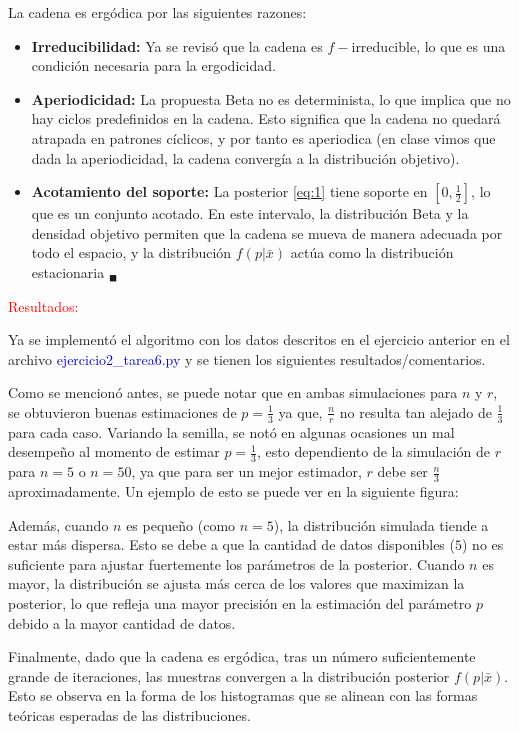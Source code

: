 La cadena es ergódica por las siguientes razones:
\begin{itemize}
	\item \textbf{Irreducibilidad:} Ya se revisó que la cadena es $f-$irreducible, lo que es una condición necesaria para la ergodicidad.
	\item \textbf{Aperiodicidad:} La propuesta Beta no es determinista, lo que implica que no hay ciclos predefinidos en la cadena. Esto significa que la cadena no quedará atrapada en patrones cíclicos, y por tanto es aperiodica (en clase vimos que dada la aperiodicidad, la cadena convergía a la distribución objetivo).
	\item \textbf{Acotamiento del soporte:} La posterior \eqref{eq:1} tiene soporte en $[0, \frac{1}{2}]$, lo que es un conjunto acotado. En este intervalo, la distribución Beta y la densidad objetivo permiten que la cadena se mueva de manera adecuada por todo el espacio, y la distribución $f(p|\bar{x})$ actúa como la distribución estacionaria $_\blacksquare$
\end{itemize}

\textcolor{red}{Resultados:} 

Ya se implementó el algoritmo con los datos descritos en el ejercicio anterior en el archivo \textcolor{mediumblue}{ejercicio2\_tarea6.py} y se tienen los siguientes resultados/comentarios.

Como se mencionó antes, se puede notar que en ambas simulaciones para $n$ y $r$, se obtuvieron buenas estimaciones de $p = \frac{1}{3}$ ya que, $\frac{n}{r}$ no resulta tan alejado de $\frac{1}{3}$ para cada caso. Variando la semilla, se notó en algunas ocasiones un mal desempeño al momento de estimar $p=\frac{1}{3}$, esto dependiento de la simulación de $r$ para $n = 5$  o $n = 50$, ya que para ser un mejor estimador, $r$ debe ser $\frac{n}{3}$ aproximadamente. Un ejemplo de esto se puede ver en la siguiente figura:

Además, cuando $n$ es pequeño (como $n=5$), la distribución simulada tiende a estar más dispersa. Esto se debe a que la cantidad de datos disponibles ($5$) no es suficiente para ajustar fuertemente los parámetros de la posterior. Cuando $n$ es mayor, la distribución se ajusta más cerca de los valores que maximizan la posterior, lo que refleja una mayor precisión en la estimación del parámetro $p$ debido a la mayor cantidad de datos.

Finalmente, dado que la cadena es ergódica, tras un número suficientemente grande de iteraciones, las muestras convergen a la distribución posterior $f(p|\bar{x})$. Esto se observa en la forma de los histogramas que se alinean con las formas teóricas esperadas de las distribuciones.

